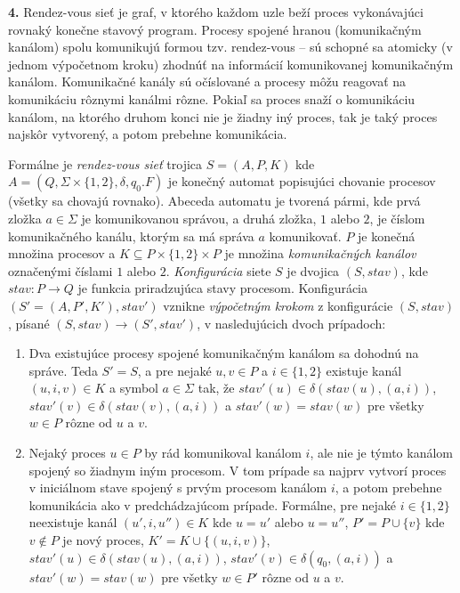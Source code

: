\documentclass[12pt]{article}
\newcommand{\task}[2]{\par \noindent \textbf{{#1}.} \hspace{3pt} #2 \vspace{10pt}}
\newenvironment{subtasklist}[0]{\begin{enumerate}[label=(\alph*)]}{\end{enumerate}}
\newcommand{\subtask}{\item}
\begin{document}
\task{4}{Rendez-vous sieť je graf, v ktorého každom uzle beží proces vykonávajúci rovnaký konečne stavový program. Procesy spojené hranou
	(komunikačným kanálom) spolu komunikujú formou tzv. rendez-vous -- sú schopné sa atomicky (v jednom výpočetnom kroku) zhodnúť na informácií
	komunikovanej komunikačným kanálom. Komunikačné kanály sú o\-čís\-lo\-va\-né a procesy môžu reagovať na komunikáciu rôznymi kanálmi rôzne. Pokiaľ
	sa proces snaží o komunikáciu kanálom, na ktorého druhom konci nie je žiadny iný proces, tak je taký proces najskôr vytvorený, a potom prebehne
	komunikácia.

	Formálne je \emph{rendez-vous sieť} trojica $S = (A,P,K)$ kde $A = (Q, \Sigma \times \{1,2\}, \delta, q_{0}. F)$ je konečný automat popisujúci
	chovanie procesov (všetky sa chovajú rovnako). Abeceda automatu je tvorená pármi, kde prvá zložka $a \in \Sigma$ je komunikovanou správou,
	a druhá zložka, $1$ alebo $2$, je číslom komunikačného kanálu, ktorým sa má správa $a$ komunikovať. $P$ je konečná množina procesov a
	$K \subseteq P \times \{1,2\} \times P$ je množina \emph{komunikačných kanálov} označenými číslami $1$ alebo $2$. \emph{Konfigurácia} siete
	$S$ je dvojica $(S, stav)$, kde $stav: P \to Q$ je funkcia priradzujúca stavy procesom. Konfigurácia $(S' = (A,P',K'),stav')$ vznikne
	\emph{výpočetným krokom} z konfigurácie $(S,stav)$, písané $(S,stav) \to (S',stav')$, v nasledujúcich dvoch prípadoch:

	\begin{subtasklist}
		\subtask Dva existujúce procesy spojené komunikačným kanálom sa dohodnú na správe. Teda $S' = S$, a pre nejaké $u,v \in P$ a $i \in \{1,2\}$
		existuje kanál $(u,i,v) \in K$ a symbol $a \in \Sigma$ tak, že $stav'(u) \in \delta(stav(u),(a,i))$, $stav'(v) \in \delta(stav(v), (a,i))$ a
		$stav'(w) = stav(w)$ pre všetky $w \in P$ rôzne od $u$ a $v$.
		\subtask Nejaký proces $u \in P$ by rád komunikoval kanálom $i$, ale nie je týmto kanálom spojený so žiadnym iným procesom. V tom prípade sa
		najprv vytvorí proces v iniciálnom stave spojený s prvým procesom kanálom $i$, a potom prebehne komunikácia ako v predchádzajúcom prípade.
		Formálne, pre nejaké $i \in \{1,2\}$ neexistuje kanál $(u',i,u'') \in K$ kde $u = u'$ alebo $u = u''$, $P' = P \cup \{v\}$ kde $v \not\in P$
		je nový proces, $K' = K \cup \{(u,i,v)\}$, $stav'(u) \in \delta(stav(u),(a,i))$, $stav'(v) \in \delta(q_{0}, (a,i))$ a $stav'(w) = stav(w)$
		pre všetky $w \in P'$ rôzne od $u$ a $v$.
	\end{subtasklist}

}
\end{document}
